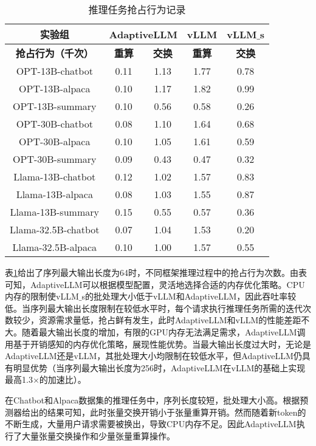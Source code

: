 \begin{table}[H]
  \centering
  \caption{推理任务抢占行为记录}
  \label{Table:推理任务抢占行为记录}
  \renewcommand{\arraystretch}{1.25}
  \small
  \begin{tabular}{c c c c c}
    \toprule
    \textbf{实验组} & \multicolumn{2}{c}{\textbf{AdaptiveLLM}} & \textbf{vLLM} & \textbf{vLLM$\_$s} \\
    \midrule
    \textbf{抢占行为（千次）} & \textbf{重算} & \textbf{交换} & \textbf{重算} & \textbf{交换} \\
    \midrule
    OPT-13B-chatbot & 0.11 & 1.13 & 1.77 & 0.78 \\
    OPT-13B-alpaca & 0.10 & 1.17 & 1.82 & 0.99 \\
    OPT-13B-summary & 0.10 & 0.56 & 0.58 & 0.26 \\
    OPT-30B-chatbot & 0.08 & 1.10 & 1.64 & 0.68 \\
    OPT-30B-alpaca & 0.10 & 1.05 & 1.61 & 0.59 \\
    OPT-30B-summary & 0.09 & 0.43 & 0.47 & 0.32 \\
    Llama-13B-chatbot & 0.12 & 1.02 & 1.57 & 0.83 \\
    Llama-13B-alpaca & 0.08 & 1.03 & 1.55 & 0.87 \\
    Llama-13B-summary & 0.15 & 0.55 & 0.57 & 0.36 \\
    Llama-32.5B-chatbot & 0.07 & 1.04 & 1.53 & 0.20 \\
    Llama-32.5B-alpaca & 0.10 & 1.00 & 1.57 & 0.55 \\
    \bottomrule
  \end{tabular}
\end{table}

表\ref{Table:推理任务抢占行为记录}给出了序列最大输出长度为64时，不同框架推理过程中的抢占行为次数。由表可知，AdaptiveLLM可以根据模型配置，灵活地选择合适的内存优化策略。CPU内存的限制使vLLM$\_$s的批处理大小低于vLLM和AdaptiveLLM，因此吞吐率较低。当序列最大输出长度限制在较低水平时，每个请求执行推理任务所需的迭代次数较少，资源需求量低，抢占鲜有发生，此时AdaptiveLLM和vLLM的性能差距不大。随着最大输出长度的增加，有限的GPU内存无法满足需求，AdaptiveLLM调用基于开销感知的内存优化策略，展现性能优势。当最大输出长度过大时，无论是AdaptiveLLM还是vLLM，其批处理大小均限制在较低水平，但AdaptiveLLM仍具有明显优势（当序列最大输出长度为256时，AdaptiveLLM在vLLM的基础上实现最高1.3$\times$的加速比）。

在Chatbot和Alpaca数据集的推理任务中，序列长度较短，批处理大小高。根据预测器给出的结果可知，此时张量交换开销小于张量重算开销。然而随着新token的不断生成，大量用户请求需要被换出，导致CPU内存不足。因此AdaptiveLLM执行了大量张量交换操作和少量张量重算操作。

